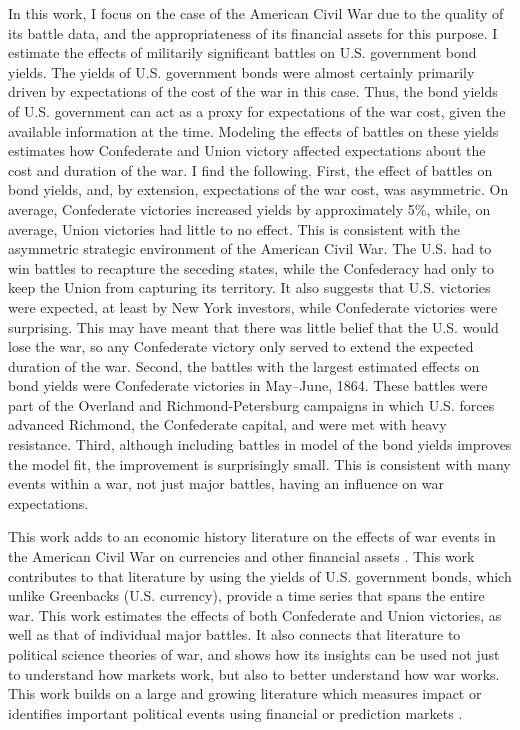 In this work, I focus on the case of the American Civil War due to the quality of its battle data, and the appropriateness of its financial assets for this purpose.
I estimate the effects of militarily significant battles on U.S. government bond yields.
The yields of U.S. government bonds were almost certainly primarily driven by expectations of the cost of the war in this case.
Thus, the bond yields of U.S. government can act as a proxy for expectations of the war cost, given the available information at the time.
Modeling the effects of battles on these yields estimates how Confederate and Union victory affected expectations about the cost and duration of the war.
I find the following.
First, the effect of battles on bond yields, and, by extension, expectations of the war cost, was asymmetric.
On average, Confederate victories increased yields by approximately 5\%, while, on average, Union victories had little to no effect.
This is consistent with the asymmetric strategic environment of the American Civil War.
The U.S. had to win battles to recapture the seceding states, while the Confederacy had only to keep the Union from capturing its territory.
It also suggests that U.S. victories were expected, at least by New York investors, while Confederate victories were surprising.
This may have meant that there was little belief that the U.S. would lose the war, so any Confederate victory only served to extend the expected duration of the war.
Second, the battles with the largest estimated effects on bond yields were Confederate victories in May--June, 1864.
These battles were part of the Overland and Richmond-Petersburg campaigns in which U.S. forces advanced Richmond, the Confederate capital, and were met with heavy resistance.
Third, although including battles in model of the bond yields improves the model fit, the improvement is surprisingly small.
This is consistent with many events within a war, not just major battles, having an influence on war expectations.

This work adds to an economic history literature on the effects of war events in the American Civil War on currencies and other financial assets \parencites{Mitchell1903}{Mitchell1908}{Schwab1901}{Roll1972}{Calomiris1988}{DavisPecquet1990}{WillardGuinnaneEtAl1996}{McCandless1996}{SmithSmith1997}{BrownBurdekin2000}{Weidenmier2000}{Weidenmier2002}{HaberMitchenerOosterlinckEtAl2014}.
This work contributes to that literature by using the yields of U.S. government bonds, which unlike Greenbacks (U.S. currency), provide a time series that spans the entire war. 
This work estimates the effects of both Confederate and Union victories, as well as that of individual major battles.
It also connects that  literature to political science theories of war, and shows how its insights can be used not just to understand how markets work, but also to better understand how war works.
This work builds on a large and growing literature which measures impact or identifies important political events using financial \parencites{NorthWeingast1989}{north2000introd}{FreyKucher2000}{sussman2000instit}{wells2000revol}{Herron2000}{eldor2004finan}{ChenSiems2004}{Greenstone2007} or prediction markets \parencites{WolfersZitzewitz2004}{ArrowForsytheGorhamEtAl2008}{WolfersZitzewitz2009}.



